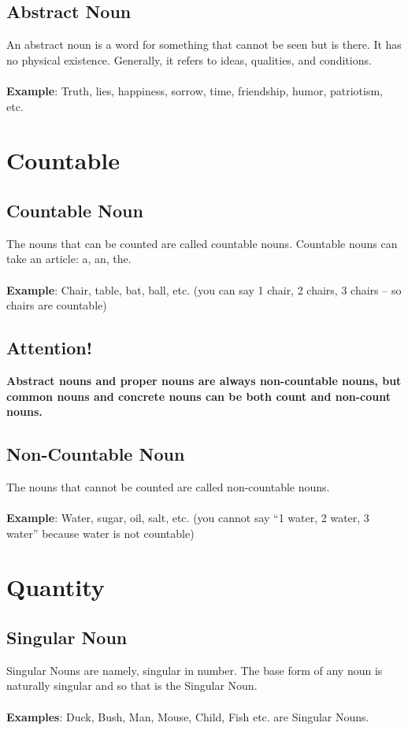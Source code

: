 \subsection{Abstract Noun}
An abstract noun is a word for something that cannot be seen but is there. It has no physical existence. Generally, it refers to ideas, qualities, and conditions.\\\\
\textbf{Example}: Truth, lies, happiness, sorrow, time, friendship, humor, patriotism, etc.

\newpage
\section{Countable}
\subsection{Countable Noun}
The nouns that can be counted are called countable nouns. Countable nouns can take an article: a, an, the.\\\\
\textbf{Example}: Chair, table, bat, ball, etc. (you can say 1 chair, 2 chairs, 3 chairs – so chairs are countable)
\subsection{Attention!}
\textbf{Abstract nouns and proper nouns are always non-countable nouns, but common nouns and concrete nouns can be both count and non-count nouns.}

\subsection{Non-Countable Noun}
The nouns that cannot be counted are called non-countable nouns.\\\\
\textbf{Example}: Water, sugar, oil, salt, etc. (you cannot say “1 water, 2 water, 3 water” because water is not countable)

\newpage
\section{Quantity}
\subsection{Singular Noun}
Singular Nouns are namely, singular in number. The base form of any noun is naturally singular and so that is the Singular Noun.\\\\
\textbf{Examples}: Duck, Bush, Man, Mouse, Child, Fish etc. are Singular Nouns.

